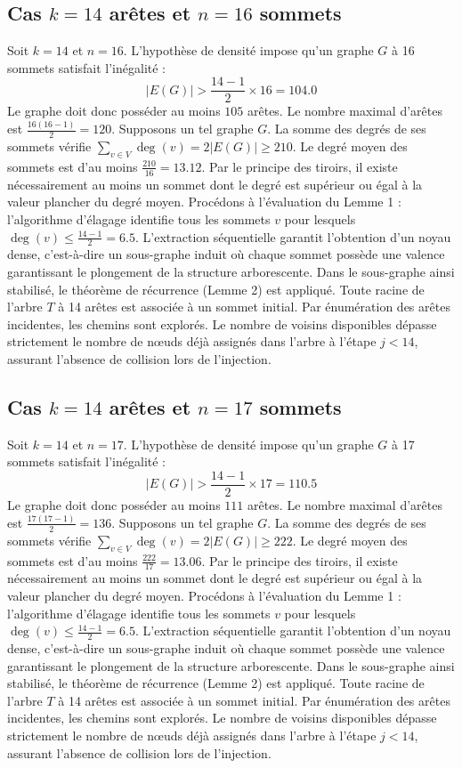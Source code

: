 \documentclass[12pt,a4paper]{article}
\begin{document}
\subsection{Cas $k = 14$ arêtes et $n = 16$ sommets}
Soit $k = 14$ et $n = 16$. L'hypothèse de densité impose qu'un graphe $G$ à 16 sommets satisfait l'inégalité :
$$ |E(G)| > \frac{14-1}{2} \times 16 = 104.0 $$
Le graphe doit donc posséder au moins $105$ arêtes. Le nombre maximal d'arêtes est $\frac{16(16-1)}{2} = 120$.
Supposons un tel graphe $G$. La somme des degrés de ses sommets vérifie $\sum_{v \in V} \deg(v) = 2|E(G)| \geq 210$.
Le degré moyen des sommets est d'au moins $\frac{210}{16} = 13.12$.
Par le principe des tiroirs, il existe nécessairement au moins un sommet dont le degré est supérieur ou égal à la valeur plancher du degré moyen.
Procédons à l'évaluation du Lemme 1 : l'algorithme d'élagage identifie tous les sommets $v$ pour lesquels $\deg(v) \leq \frac{14-1}{2} = 6.5$.
L'extraction séquentielle garantit l'obtention d'un noyau dense, c'est-à-dire un sous-graphe induit où chaque sommet possède une valence garantissant le plongement de la structure arborescente.
Dans le sous-graphe ainsi stabilisé, le théorème de récurrence (Lemme 2) est appliqué. Toute racine de l'arbre $T$ à 14 arêtes est associée à un sommet initial. Par énumération des arêtes incidentes, les chemins sont explorés. Le nombre de voisins disponibles dépasse strictement le nombre de nœuds déjà assignés dans l'arbre à l'étape $j < 14$, assurant l'absence de collision lors de l'injection.

\subsection{Cas $k = 14$ arêtes et $n = 17$ sommets}
Soit $k = 14$ et $n = 17$. L'hypothèse de densité impose qu'un graphe $G$ à 17 sommets satisfait l'inégalité :
$$ |E(G)| > \frac{14-1}{2} \times 17 = 110.5 $$
Le graphe doit donc posséder au moins $111$ arêtes. Le nombre maximal d'arêtes est $\frac{17(17-1)}{2} = 136$.
Supposons un tel graphe $G$. La somme des degrés de ses sommets vérifie $\sum_{v \in V} \deg(v) = 2|E(G)| \geq 222$.
Le degré moyen des sommets est d'au moins $\frac{222}{17} = 13.06$.
Par le principe des tiroirs, il existe nécessairement au moins un sommet dont le degré est supérieur ou égal à la valeur plancher du degré moyen.
Procédons à l'évaluation du Lemme 1 : l'algorithme d'élagage identifie tous les sommets $v$ pour lesquels $\deg(v) \leq \frac{14-1}{2} = 6.5$.
L'extraction séquentielle garantit l'obtention d'un noyau dense, c'est-à-dire un sous-graphe induit où chaque sommet possède une valence garantissant le plongement de la structure arborescente.
Dans le sous-graphe ainsi stabilisé, le théorème de récurrence (Lemme 2) est appliqué. Toute racine de l'arbre $T$ à 14 arêtes est associée à un sommet initial. Par énumération des arêtes incidentes, les chemins sont explorés. Le nombre de voisins disponibles dépasse strictement le nombre de nœuds déjà assignés dans l'arbre à l'étape $j < 14$, assurant l'absence de collision lors de l'injection.
\end{document}
